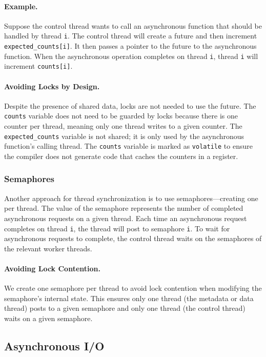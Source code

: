 \paragraph{Example.}
Suppose the control thread wants to call an asynchronous function that should
be handled by thread {\tt i}. The control thread will create a future and then
increment {\tt expected\_counts[i]}. It then passes a pointer to the future to
the asynchronous function. When the asynchronous operation completes on thread
{\tt i}, thread {\tt i} will increment {\tt counts[i]}.

\paragraph{Avoiding Locks by Design.}
Despite the presence of shared data, locks are not needed to use the future.
The {\tt counts} variable does not need to be guarded by locks because there is
one counter per thread, meaning only one thread writes to a given counter. The
{\tt expected\_counts} variable is not shared; it is only used by the
asynchronous function's calling thread. The {\tt counts} variable is marked
as {\tt volatile} to ensure the compiler does not generate code that caches the
counters in a register.

\subsubsection{Semaphores}
Another approach for thread synchronization is to use semaphores---creating one
per thread. The value of the semaphore represents the number of completed
asynchronous requests on a given thread. Each time an asynchronous request
completes on thread {\tt i}, the thread will post to semaphore {\tt i}. To wait
for asynchronous requests to complete, the control thread waits on the
semaphores of the relevant worker threads.

\paragraph{Avoiding Lock Contention.} We create one semaphore per thread to
avoid lock contention when modifying the semaphore's internal state. This
ensures only one thread (the metadata or data thread) posts to a given
semaphore and only one thread (the control thread) waits on a given semaphore.

\subsection{Asynchronous I/O}
